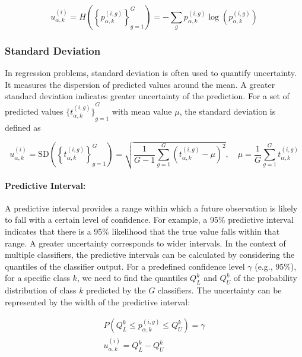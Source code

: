 \begin{equation}
u_{\alpha,k}^{(i)}=H\left( {\left\{p_{\alpha,k}^{(i,g)}\right\}}_{g=1}^{G}\right)=-\sum_{g}{p_{\alpha,k}^{(i,g)} \log\left(p_{\alpha,k}^{(i,g)}\right)}
\label{crowd.Eq.5.uncertainty}
\end{equation}


\subsubsection{Standard Deviation}
In regression problems, standard deviation is often used to quantify uncertainty. It measures the dispersion of predicted values around the mean. A greater standard deviation indicates greater uncertainty of the prediction. For a set of predicted values $ {\{t_{\alpha,k}^{(i,g)} \}}_{g=1}^G $ with mean value $\mu $, the standard deviation is defined as

\begin{equation}
    u_{\alpha,k}^{(i)}=\text{SD}\left( {\left\{t_{\alpha,k}^{(i,g)}\right\}}_{g=1}^G\right)=\sqrt {\frac{1}{G-1} \sum_{g=1}^G {\left(t_{\alpha,k}^{(i,g)}-\mu\right)}^2},\quad\mu=\frac{1}{G}\sum_{g=1}^{G}{t_{\alpha,k}^{(i,g)}}
    \label{crowd.Eq.6.uncertainty.sd}
\end{equation}

\paragraph{Predictive Interval:}
A predictive interval provides a range within which a future observation is likely to fall with a certain level of confidence. For example, a 95\% predictive interval indicates that there is a 95\% likelihood that the true value falls within that range. A greater uncertainty corresponds to wider intervals. In the context of multiple classifiers, the predictive intervals can be calculated by considering the quantiles  of the classifier output. For a predefined confidence level $\gamma $ (e.g., 95\%), for a specific class $k $, we need to find the quantiles $Q_{L}^{k} $ and $Q_{U}^{k} $ of the probability distribution of class $k $ predicted by the $G $ classifiers. The uncertainty can be represented by the width of the predictive interval:

\begin{equation}
    \begin{aligned}
        P\left(Q_L^{k} \leq p_{\alpha,k}^{(i,g)} \leq Q_U^{k}\right) = \gamma
        \\
        u_{\alpha,k}^{(i)} = Q_L^{k} - Q_U^{k}
    \end{aligned}
    \label{crowd.Eq.uncertainty}
\end{equation}

